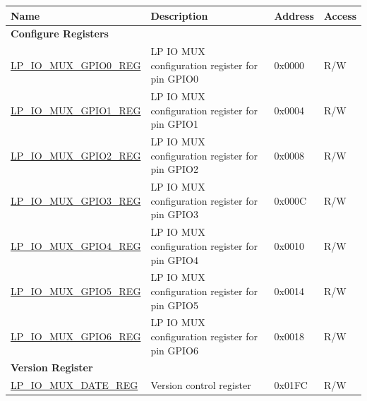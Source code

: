 \begin{longtable}{ | p{6cm} | p{7.2cm} | p{1.3cm} | p{1cm} | }
\hline\rowcolor{lightgray}
\textbf{Name} & \textbf{Description} &  \textbf{Address} & \textbf{Access} \\ \hline
\endhead
\multicolumn{4}{|l|}{\textbf{Configure Registers}} \\ \hline
\hyperref[regdesc:LPIOMUXGPIONREG]{LP\_IO\_MUX\_GPIO0\_REG} & LP IO MUX configuration register for pin GPIO0 & 0x0000 & R/W \\ \hline
\hyperref[regdesc:LPIOMUXGPIONREG]{LP\_IO\_MUX\_GPIO1\_REG} & LP IO MUX configuration register for pin GPIO1 & 0x0004 & R/W \\ \hline
\hyperref[regdesc:LPIOMUXGPIONREG]{LP\_IO\_MUX\_GPIO2\_REG} & LP IO MUX configuration register for pin GPIO2 & 0x0008 & R/W \\ \hline
\hyperref[regdesc:LPIOMUXGPIONREG]{LP\_IO\_MUX\_GPIO3\_REG} & LP IO MUX configuration register for pin GPIO3 & 0x000C & R/W \\ \hline
\hyperref[regdesc:LPIOMUXGPIONREG]{LP\_IO\_MUX\_GPIO4\_REG} & LP IO MUX configuration register for pin GPIO4 & 0x0010 & R/W \\ \hline
\hyperref[regdesc:LPIOMUXGPIONREG]{LP\_IO\_MUX\_GPIO5\_REG} & LP IO MUX configuration register for pin GPIO5 & 0x0014 & R/W \\ \hline
\hyperref[regdesc:LPIOMUXGPIONREG]{LP\_IO\_MUX\_GPIO6\_REG} & LP IO MUX configuration register for pin GPIO6 & 0x0018 & R/W \\ \hline
\multicolumn{4}{|l|}{\textbf{Version Register}} \\ \hline
\hyperref[regdesc:LPIOMUXDATEREG]{LP\_IO\_MUX\_DATE\_REG} & Version control register & 0x01FC & R/W \\ \hline
\end{longtable}
